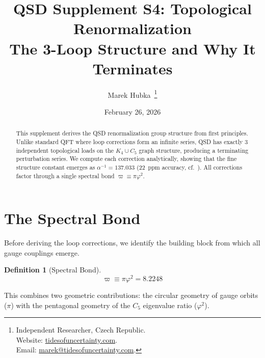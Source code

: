 \documentclass[11pt,a4paper]{article}
\title{
  \textbf{QSD Supplement S4: Topological Renormalization}\\[0.5em]
  \Large The 3-Loop Structure and Why It Terminates\\[1em]
}
\author{
  Marek Hubka\, \orcidlink{0009-0003-2476-9017}
  \thanks{
    Independent Researcher, Czech Republic.\\
    Website: \href{http://www.tidesofuncertainty.com}{tidesofuncertainty.com}.\\
    Email: \href{mailto:marek@tidesofuncertainty.com}{marek@tidesofuncertainty.com}.
  }
}
\date{February 26, 2026}
\theoremstyle{definition}
\newtheorem{definition}[theorem]{Definition}
\begin{document}
\maketitle

\begin{abstract}
This supplement derives the QSD renormalization group structure from first principles. Unlike standard QFT where loop corrections form an infinite series, QSD has exactly 3 independent topological loads on the $K_4 \cup C_5$ graph structure, producing a terminating perturbation series. We compute each correction analytically, showing that the fine structure constant emerges as $\alpha^{-1} = 137.033$ (22~ppm accuracy, cf.\ \cite{PDG2022}). All corrections factor through a single spectral bond $\varpi \equiv \pi\varphi^2$.
\end{abstract}

\tableofcontents

\section{The Spectral Bond}
\label{sec:specbond}

Before deriving the loop corrections, we identify the building block from which all gauge couplings emerge.

\begin{definition}[Spectral Bond]
\begin{equation}
\varpi \equiv \pi\varphi^2 = 8.2248
\label{eq:specbond}
\end{equation}
\end{definition}

This combines two geometric contributions: the circular geometry of gauge orbits ($\pi$) with the pentagonal geometry of the $C_5$ eigenvalue ratio ($\varphi^2$).
\end{document}
